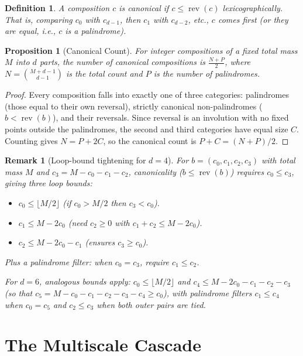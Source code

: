 \documentclass[11pt, letterpaper]{article}
\theoremstyle{paperplain}
\newtheorem{proposition}[theorem]{Proposition}
\theoremstyle{paperdef}
\newtheorem{definition}[theorem]{Definition}
\newtheorem{remark}[theorem]{Remark}
\newcommand{\rev}{\operatorname{rev}}
\begin{document}
\begin{definition}
A composition $c$ is \emph{canonical} if $c \le \rev(c)$
lexicographically.  That is, comparing $c_0$ with $c_{d-1}$, then
$c_1$ with $c_{d-2}$, etc., $c$ comes first (or they are equal, i.e.,
$c$ is a palindrome).
\end{definition}

\begin{proposition}[Canonical Count]
\label{prop:canon-count}
For integer compositions of a fixed total mass $M$ into $d$ parts, the
number of canonical compositions is $\tfrac{N + P}{2}$, where
$N = \binom{M+d-1}{d-1}$ is the total count and $P$ is the number of
palindromes.
\end{proposition}

\begin{proof}
Every composition falls into exactly one of three categories:
palindromes (those equal to their own reversal), strictly canonical
non-palindromes ($b < \rev(b)$), and their reversals.  Since reversal
is an involution with no fixed points outside the palindromes, the
second and third categories have equal size $C$.  Counting gives
$N = P + 2C$, so the canonical count is $P + C = (N+P)/2$.
\end{proof}

\begin{remark}[Loop-bound tightening for $d = 4$]
For $b = (c_0, c_1, c_2, c_3)$ with total mass $M$ and
$c_3 = M - c_0 - c_1 - c_2$,
canonicality ($b \le \rev(b)$) requires $c_0 \le c_3$, giving three
loop bounds:
\begin{itemize}
  \item $c_0 \le \lfloor M/2 \rfloor$ \quad (if $c_0 > M/2$ then
    $c_3 < c_0$).
  \item $c_1 \le M - 2c_0$ \quad (need $c_2 \ge 0$ with
    $c_1 + c_2 \le M - 2c_0$).
  \item $c_2 \le M - 2c_0 - c_1$ \quad (ensures $c_3 \ge c_0$).
\end{itemize}
Plus a palindrome filter: when $c_0 = c_3$, require $c_1 \le c_2$.

For $d = 6$, analogous bounds apply: $c_0 \le \lfloor M/2 \rfloor$ and
$c_4 \le M - 2c_0 - c_1 - c_2 - c_3$ (so that
$c_5 = M - c_0 - c_1 - c_2 - c_3 - c_4 \ge c_0$), with palindrome
filters $c_1 \le c_4$ when $c_0 = c_5$ and $c_2 \le c_3$ when both
outer pairs are tied.
\end{remark}


\section{The Multiscale Cascade}\label{sec:cascade}
\end{document}
